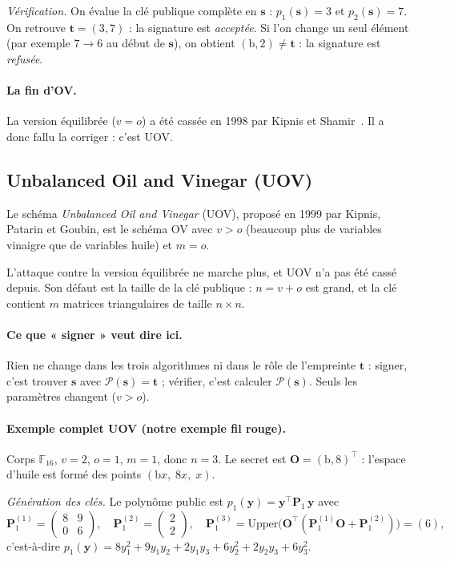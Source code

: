 \emph{Vérification.} On évalue la clé publique complète en $\mathbf{s}$ : $p_1(\mathbf{s})=3$ et $p_2(\mathbf{s})=7$. On retrouve $\mathbf{t}=(3,7)$ : la signature est \emph{acceptée}. Si l'on change un seul élément (par exemple $7\to6$ au début de $\mathbf{s}$), on obtient $(\mathrm{b},2)\neq\mathbf{t}$ : la signature est \emph{refusée}.

\paragraph{La fin d'OV.} La version équilibrée ($v=o$) a été cassée en 1998 par Kipnis et Shamir~\cite{kipnisshamir}. Il a donc fallu la corriger : c'est UOV.

\subsection{Unbalanced Oil and Vinegar (UOV)}
\begin{definition}
Le schéma \emph{Unbalanced Oil and Vinegar} (UOV), proposé en 1999 par Kipnis, Patarin et Goubin, est le schéma OV avec $v>o$ (beaucoup plus de variables vinaigre que de variables huile) et $m=o$.
\end{definition}
L'attaque contre la version équilibrée ne marche plus, et UOV n'a pas été cassé depuis. Son défaut est la taille de la clé publique : $n=v+o$ est grand, et la clé contient $m$ matrices triangulaires de taille $n\times n$.

\paragraph{Ce que « signer » veut dire ici.} Rien ne change dans les trois algorithmes ni dans le rôle de l'empreinte $\mathbf{t}$ : signer, c'est trouver $\mathbf{s}$ avec $\mathcal{P}(\mathbf{s})=\mathbf{t}$ ; vérifier, c'est calculer $\mathcal{P}(\mathbf{s})$. Seuls les paramètres changent ($v>o$).

\paragraph{Exemple complet UOV (notre exemple fil rouge).}\label{sec:fil} Corps $\mathbb{F}_{16}$, $v=2$, $o=1$, $m=1$, donc $n=3$. Le secret est $\mathbf{O}=(\mathrm{b},8)^{\top}$ : l'espace d'huile est formé des points $(\mathrm{b}x,\;8x,\;x)$.

\emph{Génération des clés.} Le polynôme public est $p_1(\mathbf{y})=\mathbf{y}^{\top}\mathbf{P}_1\,\mathbf{y}$ avec
\[\mathbf{P}^{(1)}_1=\begin{pmatrix}8&9\\0&6\end{pmatrix},\quad \mathbf{P}^{(2)}_1=\begin{pmatrix}2\\2\end{pmatrix},\quad \mathbf{P}^{(3)}_1=\mathrm{Upper}\bigl(\mathbf{O}^{\top}(\mathbf{P}^{(1)}_1\mathbf{O}+\mathbf{P}^{(2)}_1)\bigr)=(6),\]
c'est-à-dire $p_1(\mathbf{y})=8y_1^2+9y_1y_2+2y_1y_3+6y_2^2+2y_2y_3+6y_3^2$.


